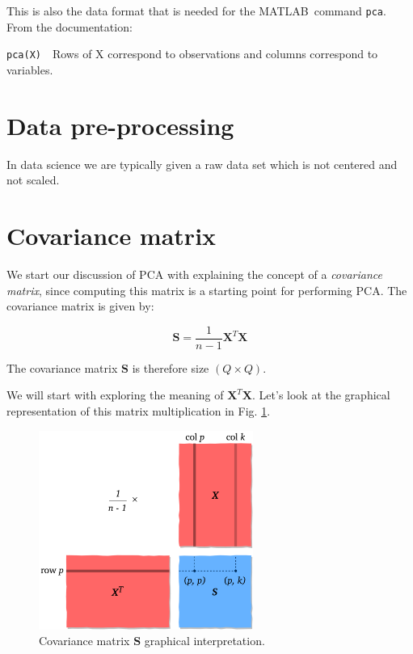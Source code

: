 \documentclass[10pt,twocolumn]{article}
\begin{document}
This is also the data format that is needed for the MATLAB\textregistered \, command \texttt{pca}. From the documentation:


\begin{framed}
\texttt{pca(X)}
\,\,
Rows of X correspond to observations and columns correspond to variables.
\end{framed}

\section{Data pre-processing}

In data science we are typically given a raw data set which is not centered and not scaled. 

\section{Covariance matrix}

We start our discussion of PCA with explaining the concept of a \textit{covariance matrix}, since computing this matrix is a starting point for performing PCA. The covariance matrix is given by:

\begin{equation}
\bm{S} = \frac{1}{n-1} \bm{X}^T \bm{X}
\end{equation}

The covariance matrix $\bm{S}$ is therefore size $(Q \times Q)$.

We will start with exploring the meaning of $\bm{X}^T \bm{X}$. Let's look at the graphical representation of this matrix multiplication in Fig. \ref{fig:covariance-matrix}.

\begin{figure}[H]
\centering\includegraphics[width=7cm]{cov-matrix.png}
\caption{Covariance matrix $\bm{S}$ graphical interpretation.}
\label{fig:covariance-matrix}
\end{figure}
\end{document}

